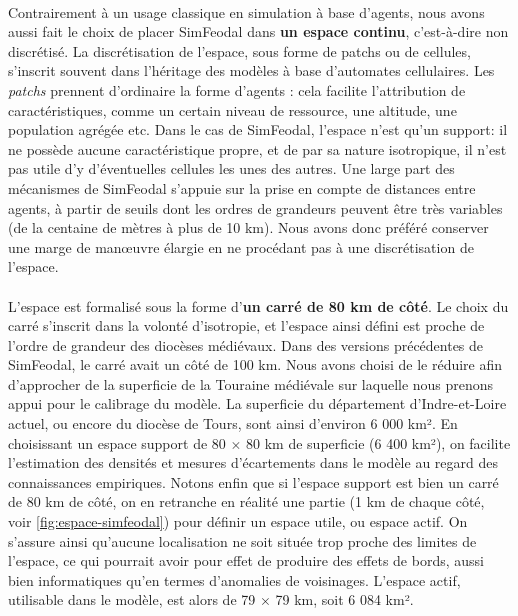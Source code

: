 \paragraph[Continu]{}Contrairement à un usage classique en simulation à base d'agents, nous avons aussi fait le choix de placer SimFeodal dans \textbf{un espace continu}, c'est-à-dire non discrétisé.
La discrétisation de l'espace, sous forme de \og patchs\fg{} ou de \og cellules\fg{}, s'inscrit souvent dans l'héritage des modèles à base d'automates cellulaires.
Les \textit{patchs} prennent d'ordinaire la forme d'agents : cela facilite l'attribution de caractéristiques, comme un certain niveau de ressource, une altitude, une population agrégée etc.
Dans le cas de SimFeodal, l'espace n'est qu'un support: il ne possède aucune caractéristique propre, et de par sa nature isotropique, il n'est pas utile d'y d'éventuelles cellules les unes des autres.
Une large part des mécanismes de SimFeodal s'appuie sur la prise en compte de distances entre agents, à partir de seuils dont les ordres de grandeurs peuvent être très variables (de la centaine de mètres à plus de 10 km).
Nous avons donc préféré conserver une marge de manœuvre élargie en ne procédant pas à une discrétisation de l'espace.

\paragraph[Dimension]{}L'espace est formalisé sous la forme d'\textbf{un carré de 80 km de côté}.
Le choix du carré s'inscrit dans la volonté d'isotropie, et l'espace ainsi défini est proche de l'ordre de grandeur des diocèses médiévaux.
Dans des versions précédentes de SimFeodal, le carré avait un côté de 100 km. Nous avons choisi de le réduire afin d'approcher de la superficie de la Touraine médiévale sur laquelle nous prenons appui pour le calibrage du modèle. 
La superficie du département d'Indre-et-Loire actuel, ou encore du diocèse de Tours, sont ainsi d'environ 6 000 km².
En choisissant un espace support de 80 $\times$ 80 km de superficie (6 400 km²), on facilite l'estimation des densités et mesures d'écartements dans le modèle au regard des connaissances empiriques.
Notons enfin que si l'espace support est bien un carré de 80 km de côté, on en retranche en réalité une partie (1 km de chaque côté, voir \cref{fig:espace-simfeodal}) pour définir un espace utile, ou \og espace actif\fg{}.
On s'assure ainsi qu'aucune localisation ne soit située trop proche des limites de l'espace, ce qui pourrait avoir pour effet de produire des \og effets de bords\fg{}, aussi bien informatiques qu'en termes d'anomalies de voisinages.
L'espace actif, utilisable dans le modèle, est alors de 79 $\times$ 79 km, soit 6 084 km².

